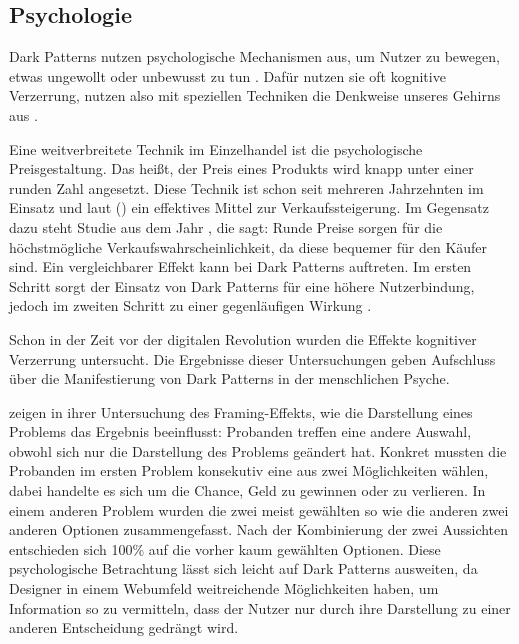 \documentclass[conference,compsoc,final,a4paper]{IEEEtran}
\begin{document}
\subsection{Psychologie}
\label{chap:Psychologie}
Dark Patterns nutzen psychologische Mechanismen aus, um Nutzer zu bewegen, etwas ungewollt oder unbewusst zu tun \autocite{Brignull}. Dafür nutzen sie oft kognitive Verzerrung, nutzen also mit speziellen Techniken die Denkweise unseres Gehirns aus \autocite{Mathur2019}.

Eine weitverbreitete Technik im Einzelhandel ist die psychologische Preisgestaltung. Das heißt, der Preis eines Produkts wird knapp unter einer runden Zahl angesetzt. Diese Technik ist schon seit mehreren Jahrzehnten im Einsatz und laut \citeauthor{Bizer_2005} () \autocite{Bizer_2005} ein effektives Mittel zur Verkaufssteigerung. Im Gegensatz dazu steht \citeauthor{Wieseke_2015} \autocite{Wieseke_2015} Studie aus dem Jahr , die sagt: Runde Preise sorgen für die höchstmögliche Verkaufswahrscheinlichkeit, da diese bequemer für den Käufer sind. Ein vergleichbarer Effekt kann bei Dark Patterns auftreten. Im ersten Schritt sorgt der Einsatz von Dark Patterns für eine höhere Nutzerbindung, jedoch im zweiten Schritt zu einer gegenläufigen Wirkung \autocite{M.Bhoot2020}.

Schon in der Zeit vor der digitalen Revolution wurden die Effekte kognitiver Verzerrung untersucht. Die Ergebnisse dieser Untersuchungen geben Aufschluss über die Manifestierung von Dark Patterns in der menschlichen Psyche.

\citeauthor{Tversky453} \autocite{Tversky453} zeigen in ihrer Untersuchung des Framing-Effekts, wie die Darstellung eines Problems das Ergebnis beeinflusst: Probanden treffen eine andere Auswahl, obwohl sich nur die Darstellung des Problems geändert hat. Konkret mussten die Probanden im ersten Problem konsekutiv eine aus zwei Möglichkeiten wählen, dabei handelte es sich um die Chance, Geld zu gewinnen oder zu verlieren. In einem anderen Problem wurden die zwei meist gewählten so wie die anderen zwei anderen Optionen zusammengefasst. Nach der Kombinierung der zwei Aussichten entschieden sich 100\% auf die vorher kaum gewählten Optionen. Diese psychologische Betrachtung lässt sich leicht auf Dark Patterns ausweiten, da Designer in einem Webumfeld weitreichende Möglichkeiten haben, um Information so zu vermitteln, dass der Nutzer nur durch ihre Darstellung zu einer anderen Entscheidung gedrängt wird.
\end{document}
